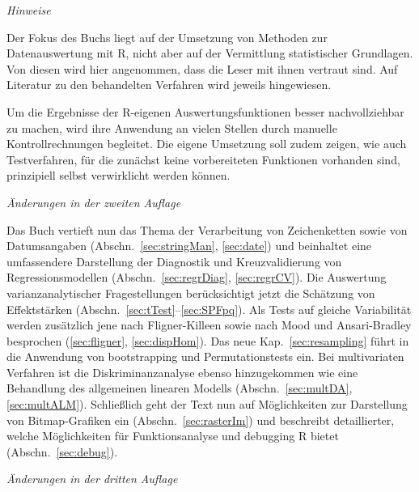 \textit{Hinweise}

Der Fokus des Buchs liegt auf der Umsetzung von Methoden zur Datenauswertung mit R, nicht aber auf der Vermittlung statistischer Grundlagen. Von diesen wird hier angenommen, dass die Leser mit ihnen vertraut sind. Auf Literatur zu den behandelten Verfahren wird jeweils hingewiesen.

Um die Ergebnisse der R-eigenen Auswertungsfunktionen besser nachvollziehbar zu machen, wird ihre Anwendung an vielen Stellen durch manuelle Kontrollrechnungen begleitet. Die eigene Umsetzung soll zudem zeigen, wie auch Testverfahren, für die zunächst keine vorbereiteten Funktionen vorhanden sind, prinzipiell selbst verwirklicht werden können.


\textit{Änderungen in der zweiten Auflage}

Das Buch vertieft nun das Thema der Verarbeitung von Zeichenketten sowie von Datumsangaben (Abschn.\ \ref{sec:stringMan}, \ref{sec:date}) und beinhaltet eine umfassendere Darstellung der Diagnostik und Kreuzvalidierung von Regressionsmodellen (Abschn.\ \ref{sec:regrDiag}, \ref{sec:regrCV}). Die Auswertung varianzanalytischer Fragestellungen berücksichtigt jetzt die Schätzung von Effektstärken (Abschn.\ \ref{sec:tTest}--\ref{sec:SPFpq}). Als Tests auf gleiche Variabilität werden zusätzlich jene nach Fligner-Killeen sowie nach Mood und Ansari-Bradley besprochen (\ref{sec:fligner}, \ref{sec:dispHom}). Das neue Kap.\ \ref{sec:resampling} führt in die Anwendung von bootstrapping und Permutationstests ein. Bei multivariaten Verfahren ist die Diskriminanzanalyse ebenso hinzugekommen wie eine Behandlung des allgemeinen linearen Modells (Abschn.\ \ref{sec:multDA}, \ref{sec:multALM}). Schließlich geht der Text nun auf Möglichkeiten zur Darstellung von Bitmap-Grafiken ein (Abschn.\ \ref{sec:rasterIm}) und beschreibt detaillierter, welche Möglichkeiten für Funktionsanalyse und debugging R bietet (Abschn.\ \ref{sec:debug}).

\textit{Änderungen in der dritten Auflage}

